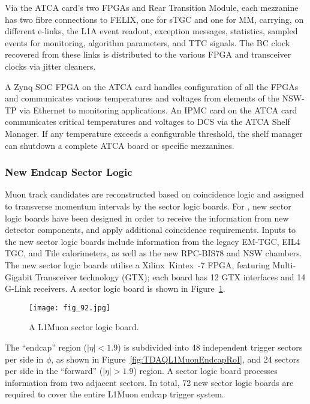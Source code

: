 \documentclass[cernpreprint, atlasdraft=false, UKenglish,british,orcidlogo, texmf, orcidlogo]{atlasdoc}
\begin{document}
 
Via the \gls{ATCA} card's two \glspl{FPGA} and Rear Transition Module, each mezzanine has two fibre connections to \gls{FELIX}, one for \gls{sTGC} and one for \gls{MM}, carrying, on different \glspl{e-link}, the \gls{L1A} event readout, exception messages, statistics, sampled events for monitoring, algorithm parameters, and \gls{TTC} signals.
The \gls{BC} clock recovered from these links is distributed to the various \gls{FPGA} and transceiver clocks via jitter cleaners.
 
A Zynq \gls{SOC} \gls{FPGA} on the \gls{ATCA} card handles configuration of all the \glspl{FPGA} and communicates various temperatures and voltages from elements of the  \gls{NSW-TP} via Ethernet to monitoring applications.
An \gls{IPMC} card on the \gls{ATCA} card communicates critical temperatures and voltages to \gls{DCS} via the \gls{ATCA} Shelf Manager.
If any temperature exceeds a configurable threshold, the shelf manager can shutdown a complete \gls{ATCA} board or specific mezzanines.
 
 


 
\subsubsection{New Endcap Sector Logic}\label{sec:EndcapSL}
Muon track candidates are reconstructed based on coincidence logic and assigned to transverse momentum intervals by the
sector logic boards.  For \RunThr, new sector logic boards have been designed in order to receive the information from new detector components, and apply additional coincidence requirements.  Inputs to the new sector logic boards include information from the legacy \gls{EM-TGC}, \gls{EIL4} \gls{TGC}, and Tile calorimeters, as well as the new \gls{RPC-BIS78} and \gls{NSW} chambers.  The new sector logic boards utilise a Xilinx\textregistered~Kintex\textregistered~-7 \gls{FPGA}, featuring Multi-Gigabit Transceiver technology (\gls{GTX}); each board has 12 GTX interfaces and 14 G-Link receivers.  A sector logic board is shown in Figure~\ref{fig:TDAQL1MuonSectorLogicBoard}.
 
\begin{figure}[htbp!]
\centerline{\texttt{[image: fig\_92.jpg]}}
\caption{A \gls{L1Muon} sector logic board.}
\label{fig:TDAQL1MuonSectorLogicBoard}
\end{figure}
 
The ``endcap'' region ($|\eta| < 1.9$) is subdivided into 48 independent trigger sectors per side  in $\phi$, as shown in Figure~\ref{fig:TDAQL1MuonEndcapRoI}, and 24 sectors per side in the ``forward'' ($|\eta| > 1.9$) region.  A sector logic board processes information from two adjacent sectors.  In total, 72 new sector logic boards are required to cover the entire \gls{L1Muon} endcap trigger system.
 
\end{document}

